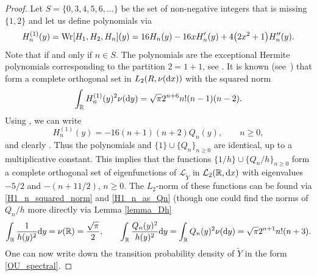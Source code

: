 \documentclass[10pt,a4paper]{amsart}
\numberwithin{equation}{section}
\theoremstyle{definition}
\def\L{{\mathcal L}}
\def\r{{\mathbb R}}
\def\wr{{\textnormal{Wr}}}
\def\d{{\textnormal d}}
\begin{document}
\begin{proof}
Let $S=\{0,3,4,5,6,\dots\}$ be the set of non-negative integers that is missing $\{1,2\}$ and let us define polynomials  via
\[
H^{(1)}_n(y)=\wr[H_1,H_2,H_n](y)=16 H_n(y)-16 x H_n'(y)+4 \bigl(2x^2+1\bigr) H_n''(y).
\]
Note that  if and only if $n\in S$.
The polynomials  are the exceptional Hermite polynomials corresponding to the partition $2=1+1$, see \cite[Definition 5.1]{Ullate_2014}. It is known (see~\cite[Propositions 5.7 and 5.8]{Ullate_2014}) that  form a complete orthogonal set in $L_2(R,\nu(\d x))$ with the squared norm
\begin{equation}\label{H1_n_squared_norm}
\int_{\r} H^{(1)}_n(y)^2 \nu(\d y)=\sqrt{\pi} 2^{n+6} n! (n-1)(n-2).
\end{equation}
Using \cite[Theorem 3.1]{Ullate_2018}, we can write
\begin{equation}\label{H1_n_as_Qn}
H^{(1)}_n(y)=-16 (n+1)(n+2) Q_n(y), \qquad n\ge 0,
\end{equation}
and clearly . Thus the polynomials  and $\{1\} \cup \{Q_n\}_{n \ge 0}$ are identical, up to a multiplicative constant. This implies that the functions $\{1/h\} \cup \{Q_n/h\}_{n \ge 0}$ form a complete orthogonal set of eigenfunctions of $\L_{\widetilde Y}$ in $\L_2(\r,\d x)$ with eigenvalues $-5/2$ and $-(n+11/2)$, $n\ge 0$. The $L_2$-norm of these functions can be found via \eqref{H1_n_squared_norm} and \eqref{H1_n_as_Qn} (though one could find the norms of $Q_n/h$ more directly via Lemma \ref{lemma_Dh}
\[
\int_{\r} \frac{1}{h(y)^2} \d y=\nu(\r)=\frac{\sqrt{\pi}}{2}, \qquad \int_{\r} \frac{Q_n(y)^2}{h(y)^2} \d y=
\int_{\r} Q_n(y)^2 \nu(\d y)=\sqrt{\pi} 2^{n+1} n! (n+3).
\]
One can now write down the transition probability density of $\widetilde Y$ in the form \eqref{OU_spectral}.
\end{proof}
\end{document}
